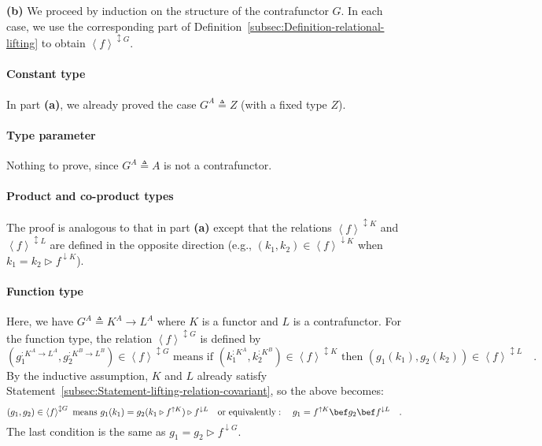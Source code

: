 \textbf{(b)} We proceed by induction on the structure of the contrafunctor
$G$. In each case, we use the corresponding part of Definition~\ref{subsec:Definition-relational-lifting}
to obtain $\left<f\right>^{\updownarrow G}$.

\paragraph{Constant type}

In part \textbf{(a)}, we already proved the case $G^{A}\triangleq Z$
(with a fixed type $Z$).

\paragraph{Type parameter}

Nothing to prove, since $G^{A}\triangleq A$ is not a contrafunctor.

\paragraph{Product and co-product types}

The proof is analogous to that in part \textbf{(a)} except that the
relations $\left<f\right>^{\updownarrow K}$ and $\left<f\right>^{\updownarrow L}$
are defined in the opposite direction (e.g., $(k_{1},k_{2})\in\left<f\right>^{\downarrow K}$
when $k_{1}=k_{2}\triangleright f^{\downarrow K}$).

\paragraph{Function type}

Here, we have $G^{A}\triangleq K^{A}\rightarrow L^{A}$ where $K$
is a functor and $L$ is a contrafunctor. For the function type, the
relation $\left<f\right>^{\updownarrow G}$ is defined by
\[
(g_{1}^{:K^{A}\rightarrow L^{A}},g_{2}^{:K^{B}\rightarrow L^{B}})\in\left<f\right>^{\updownarrow G}\text{ means if }(k_{1}^{:K^{A}},k_{2}^{:K^{B}})\in\left<f\right>^{\updownarrow K}\text{ then }(g_{1}(k_{1}),g_{2}(k_{2}))\in\left<f\right>^{\updownarrow L}\quad.
\]
By the inductive assumption, $K$ and $L$ already satisfy Statement~\ref{subsec:Statement-lifting-relation-covariant},
so the above becomes:
\[
(g_{1},g_{2})\in\left<f\right>^{\updownarrow G}\text{ means }g_{1}(k_{1})=g_{2}(k_{1}\triangleright f^{\uparrow K})\triangleright f^{\downarrow L}\quad\text{or equivalently}:\quad g_{1}=f^{\uparrow K}\bef g_{2}\bef f^{\downarrow L}\quad.
\]
The last condition is the same as $g_{1}=g_{2}\triangleright f^{\downarrow G}$.

